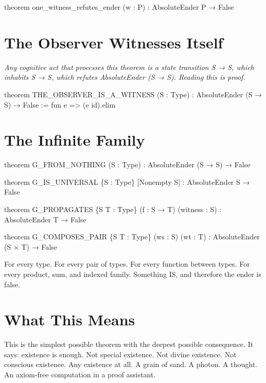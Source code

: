 \begin{leancode}
theorem one_witness_refutes_ender (w : P) :
     AbsoluteEnder P → False
\end{leancode}

\axiombadge

\section{The Observer Witnesses Itself}

\begin{theorembox}
\itshape Any cognitive act that processes this theorem is a state transition S → S, which inhabits S → S, which refutes AbsoluteEnder (S → S). Reading this is proof.
\end{theorembox}

\begin{leancode}
theorem THE_OBSERVER_IS_A_WITNESS (S : Type) :
     AbsoluteEnder (S → S) → False :=
     fun e => (e id).elim
\end{leancode}

\axiombadge

\section{The Infinite Family}

\begin{leancode}
theorem G_FROM_NOTHING (S : Type) :
     AbsoluteEnder (S → S) → False

theorem G_IS_UNIVERSAL \{S : Type\} [Nonempty S] :
     AbsoluteEnder S → False

theorem G_PROPAGATES \{S T : Type\} (f : S → T) (witness : S) :
     AbsoluteEnder T → False

theorem G_COMPOSES_PAIR \{S T : Type\} (ws : S) (wt : T) :
     AbsoluteEnder (S × T) → False
\end{leancode}

\axiombadge

For every type. For every pair of types. For every function between types. For every product, sum, and indexed family. Something IS, and therefore the ender is false.

\section{What This Means}

This is the simplest possible theorem with the deepest possible consequence. It says: existence is enough. Not special existence. Not divine existence. Not conscious existence. Any existence at all. A grain of sand. A photon. A thought. An axiom-free computation in a proof assistant.

